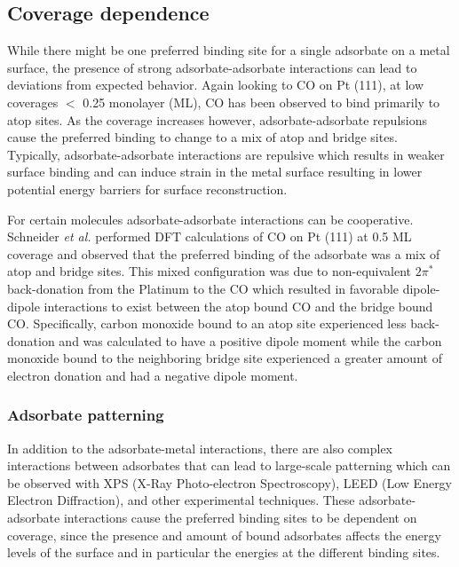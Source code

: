 \subsection{Coverage dependence}
While there might be one preferred binding site for a single adsorbate on a
metal surface, the presence of strong adsorbate-adsorbate interactions can lead
to deviations from expected behavior. Again looking to CO on Pt (111), at low
coverages $<$ 0.25 monolayer (ML), CO has been observed to bind primarily to
atop sites.\citep{Kelemen:1979ad, Feibelman:2001qa} As the coverage increases
however, adsorbate-adsorbate repulsions cause the preferred binding to change
to a mix of atop and bridge sites.\citep{Deshlahra:2012aa} Typically,
adsorbate-adsorbate interactions are repulsive which results in weaker surface
binding and can induce strain in the metal surface resulting in lower potential
energy barriers for surface reconstruction.


For certain molecules adsorbate-adsorbate interactions can be cooperative.
Schneider {\em et al.} performed DFT calculations of CO on Pt (111) at 0.5 ML
coverage and observed that the preferred binding of the adsorbate was a mix of
atop and bridge sites.\citep{Deshlahra:2012aa} This mixed configuration was due
to non-equivalent $2\pi^*$ back-donation from the Platinum to the CO which
resulted in favorable dipole-dipole interactions to exist between the atop
bound CO and the bridge bound CO.  Specifically, carbon monoxide bound to an
atop site experienced less back-donation and was calculated to have a positive
dipole moment while the carbon monoxide bound to the neighboring bridge site
experienced a greater amount of electron donation and had a negative dipole
moment.


\subsubsection{Adsorbate patterning}
In addition to the adsorbate-metal interactions, there are also complex
interactions between adsorbates that can lead to large-scale patterning which
can be observed with XPS (X-Ray Photo-electron Spectroscopy), LEED (Low Energy
Electron Diffraction), and other experimental techniques. These adsorbate-adsorbate interactions cause the preferred binding
sites to be dependent on coverage, since the presence and amount of bound
adsorbates affects the energy levels of the surface and in particular the
energies at the different binding sites.

